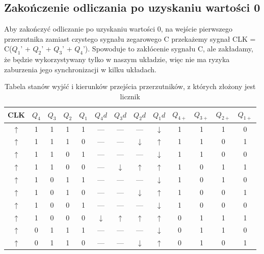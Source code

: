 \documentclass{article}
\begin{document}
    \subsection{Zakończenie odliczania po uzyskaniu wartości 0}
    Aby zakończyć odliczanie po uzyskaniu wartości 0, na wejście pierwszego przerzutnika zamiast czystego
    sygnału zegarowego C przekażemy sygnał CLK = C(\(Q_1\)' + \(Q_2\)' + \(Q_3\)' + \(Q_4\)'). Spowoduje to zakłócenie sygnału C,
    ale zakładamy, że będzie wykorzystywany tylko w naszym układzie, więc nie ma ryzyka zaburzenia jego
    synchronizacji w kilku układach.

    \begin{table}[H]
        \centering
        \captionsetup{font=small, skip=2pt}
        \caption{Tabela stanów wyjść i kierunków przejścia przerzutników, z których złożony jest licznik}
        \begin{tabular}{|c|c|c|c|c|c|c|c|c|c|c|c|c|}
            \hline
            CLK & \(Q_4\) & \(Q_3\) & \(Q_2\) & \(Q_1\) & \(Q_4d\) & \(Q_3d\) & \(Q_2d\) & \(Q_1d\) & \(Q_{4+}\) & \(Q_{3+}\) & \(Q_{2+}\) & \(Q_{1+}\)\\
            \hline
            \(\uparrow\) & 1 & 1 & 1 & 1 & --- & --- & --- & \(\downarrow\) & 1 & 1 & 1 & 0\\
            \(\uparrow\) & 1 & 1 & 1 & 0 & --- & --- & \(\downarrow\) & \(\uparrow\) & 1 & 1 & 0 & 1\\
            \(\uparrow\) & 1 & 1 & 0 & 1 & --- & --- & --- & \(\downarrow\) & 1 & 1 & 0 & 0\\
            \(\uparrow\) & 1 & 1 & 0 & 0 & --- & \(\downarrow\) & \(\uparrow\) & \(\uparrow\) & 1 & 0 & 1 & 1\\
            \(\uparrow\) & 1 & 0 & 1 & 1 & --- & --- & --- & \(\downarrow\) & 1 & 0 & 1 & 0 \\
            \(\uparrow\) & 1 & 0 & 1 & 0 & --- & --- & \(\downarrow\) & \(\uparrow\) & 1 & 0 & 0 & 1\\
            \(\uparrow\) & 1 & 0 & 0 & 1 & --- & --- & --- & \(\downarrow\) & 1 & 0 & 0 & 0\\
            \(\uparrow\) & 1 & 0 & 0 & 0 & \(\downarrow\) & \(\uparrow\) & \(\uparrow\) & \(\uparrow\) & 0 & 1 & 1 & 1\\
            \(\uparrow\) & 0 & 1 & 1 & 1 & --- & --- & --- & \(\downarrow\) & 0 & 1 & 1 & 0\\
            \(\uparrow\) & 0 & 1 & 1 & 0 & --- & --- & \(\downarrow\) & \(\uparrow\) & 0 & 1 & 0 & 1\\

\end{tabular}
\end{table}
\end{document}
